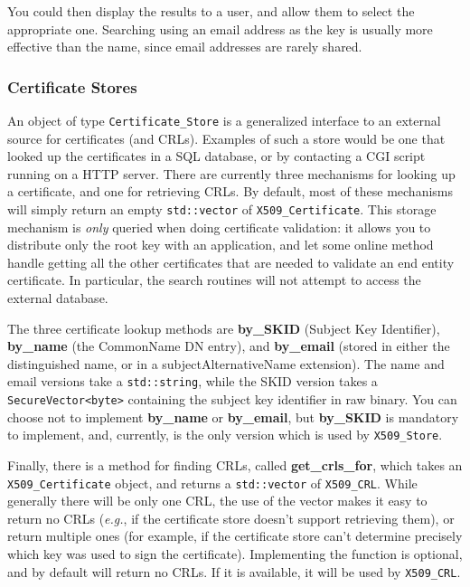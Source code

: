 \documentclass{article}
\newcommand{\function}[1]{\textbf{#1}}
\newcommand{\type}[1]{\texttt{#1}}
\newcommand{\eg}[0]{\emph{e.g.}}
\begin{document}
You could then display the results to a user, and allow them to select the
appropriate one. Searching using an email address as the key is usually more
effective than the name, since email addresses are rarely shared.

\subsubsection{Certificate Stores}

An object of type \type{Certificate\_Store} is a generalized interface to an
external source for certificates (and CRLs). Examples of such a store would be
one that looked up the certificates in a SQL database, or by contacting a CGI
script running on a HTTP server. There are currently three mechanisms for
looking up a certificate, and one for retrieving CRLs. By default, most of
these mechanisms will simply return an empty \type{std::vector} of
\type{X509\_Certificate}. This storage mechanism is \emph{only} queried when
doing certificate validation: it allows you to distribute only the root key
with an application, and let some online method handle getting all the other
certificates that are needed to validate an end entity certificate. In
particular, the search routines will not attempt to access the external
database.

The three certificate lookup methods are \function{by\_SKID} (Subject Key
Identifier), \function{by\_name} (the CommonName DN entry), and
\function{by\_email} (stored in either the distinguished name, or in a
subjectAlternativeName extension). The name and email versions take a
\type{std::string}, while the SKID version takes a \type{SecureVector<byte>}
containing the subject key identifier in raw binary. You can choose not to
implement \function{by\_name} or \function{by\_email}, but \function{by\_SKID}
is mandatory to implement, and, currently, is the only version which is used by
\type{X509\_Store}.

Finally, there is a method for finding CRLs, called \function{get\_crls\_for},
which takes an \type{X509\_Certificate} object, and returns a
\type{std::vector} of \type{X509\_CRL}. While generally there will be only one
CRL, the use of the vector makes it easy to return no CRLs (\eg, if the
certificate store doesn't support retrieving them), or return multiple ones
(for example, if the certificate store can't determine precisely which key was
used to sign the certificate). Implementing the function is optional, and by
default will return no CRLs. If it is available, it will be used by
\type{X509\_CRL}.
\end{document}
